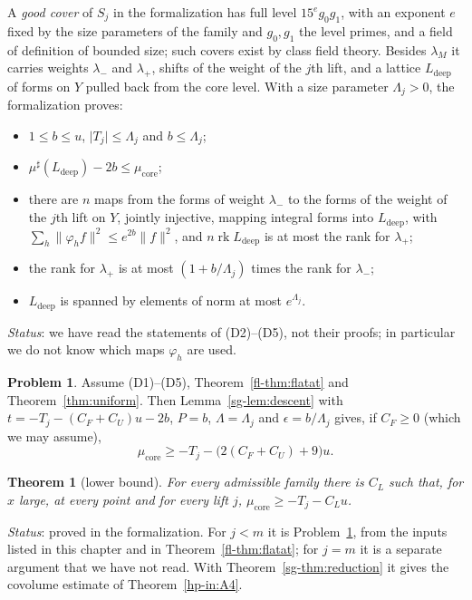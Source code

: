 \documentclass[reqno]{amsart}
\newcounter{chap}
\theoremstyle{definition}
\newtheorem{problem}{Problem}[section]
\theoremstyle{plain}
\newtheorem{theorem}{Theorem}[section]
\theoremstyle{remark}
\newcommand{\rk}{\operatorname{rk}}
\newcommand{\mus}{\mu^\sharp}
\begin{document}
A \emph{good cover} of \(S_j\) in the formalization has full level \(15^eg_0g_1\), with an exponent \(e\) fixed by the size parameters of the family and \(g_0, g_1\) the level primes, and a field of definition of bounded size; such covers exist by class field theory.  Besides \(\lambda_M\) it carries weights \(\lambda_-\) and \(\lambda_+\), shifts of the weight of the \(j\)th lift, and a lattice \(L_{\mathrm{deep}}\) of forms on \(Y\) pulled back from the core level.  With a size parameter \(\Lambda_j > 0\), the formalization proves:
\begin{itemize}
\item[(D1)] \(1 \le b \le u\), \(\lvert T_j\rvert \le \Lambda_j\) and \(b \le \Lambda_j\);
\item[(D2)] \(\mus(L_{\mathrm{deep}}) - 2b \le \mu_{\mathrm{core}}\);
\item[(D3)] there are \(n\) maps from the forms of weight \(\lambda_-\) to the forms of the weight of the \(j\)th lift on \(Y\), jointly injective, mapping integral forms into \(L_{\mathrm{deep}}\), with \(\sum_h\lVert\varphi_hf\rVert^2 \le e^{2b}\lVert f\rVert^2\), and \(n\rk L_{\mathrm{deep}}\) is at most the rank for \(\lambda_+\);
\item[(D4)] the rank for \(\lambda_+\) is at most \((1 + b/\Lambda_j)\) times the rank for \(\lambda_-\);
\item[(D5)] \(L_{\mathrm{deep}}\) is spanned by elements of norm at most \(e^{\Lambda_j}\).
\end{itemize}
\emph{Status}: we have read the statements of (D2)--(D5), not their proofs; in particular we do not know which maps \(\varphi_h\) are used.

\begin{problem}\label{pr:low-assembly}
Assume (D1)--(D5), Theorem~\ref{fl-thm:flatat} and Theorem~\ref{thm:uniform}.  Then Lemma~\ref{sg-lem:descent} with \(t = -T_j - (C_F + C_U)u - 2b\), \(P = b\), \(\Lambda = \Lambda_j\) and \(\epsilon = b/\Lambda_j\) gives, if \(C_F \ge 0\) (which we may assume),
\[
  \mu_{\mathrm{core}} \ge -T_j - \bigl(2(C_F + C_U) + 9\bigr)u .
\]
\end{problem}

\begin{theorem}[lower bound]\label{thm:low}
For every admissible family there is \(C_L\) such that, for \(x\) large, at every point and for every lift \(j\), \(\mu_{\mathrm{core}} \ge -T_j - C_Lu\).
\end{theorem}
\noindent\emph{Status}: proved in the formalization.  For \(j < m\) it is Problem~\ref{pr:low-assembly}, from the inputs listed in this chapter and in Theorem~\ref{fl-thm:flatat}; for \(j = m\) it is a separate argument that we have not read.  With Theorem~\ref{sg-thm:reduction} it gives the covolume estimate of Theorem~\ref{hp-in:A4}.
\end{document}
